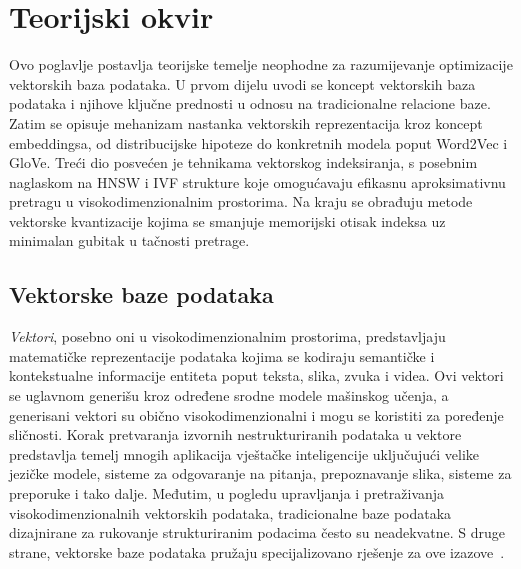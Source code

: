 \section{Teorijski okvir}
\label{sec:teorijski_okvir}


Ovo poglavlje postavlja teorijske temelje neophodne za razumijevanje
optimizacije vektorskih baza podataka. U prvom dijelu uvodi se koncept
vektorskih baza podataka i njihove ključne prednosti u odnosu na
tradicionalne relacione baze. Zatim se opisuje mehanizam nastanka
vektorskih reprezentacija kroz koncept embeddingsa, od distribucijske
hipoteze do konkretnih modela poput Word2Vec i GloVe. Treći dio
posvećen je tehnikama vektorskog indeksiranja, s posebnim naglaskom
na HNSW i IVF strukture koje omogućavaju efikasnu aproksimativnu
pretragu u visokodimenzionalnim prostorima. Na kraju se obrađuju
metode vektorske kvantizacije kojima se smanjuje memorijski otisak
indeksa uz minimalan gubitak u tačnosti pretrage.

\subsection{Vektorske baze podataka}
\label{sec:vector_databases}

\emph{Vektori}, posebno oni u visokodimenzionalnim prostorima, predstavljaju
matematičke reprezentacije podataka kojima se kodiraju semantičke i
kontekstualne informacije entiteta poput teksta, slika, zvuka i videa.
Ovi vektori se uglavnom generišu kroz određene srodne modele mašinskog učenja,
a generisani vektori su obično visokodimenzionalni i mogu se koristiti za
poređenje sličnosti. Korak pretvaranja izvornih nestrukturiranih podataka u
vektore predstavlja temelj mnogih aplikacija vještačke inteligencije
uključujući velike jezičke modele, sisteme za odgovaranje na pitanja,
prepoznavanje slika, sisteme za preporuke i tako dalje. Međutim, u pogledu
upravljanja i pretraživanja visokodimenzionalnih vektorskih podataka,
tradicionalne baze podataka dizajnirane za rukovanje strukturiranim podacima
često su neadekvatne. S druge strane, vektorske baze podataka pružaju
specijalizovano rješenje za ove izazove~\cite{ma2026comprehensive}.

